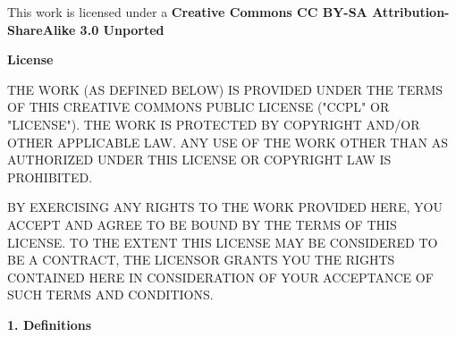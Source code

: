 
  \noindent This work is licensed under a \newline
  \textbf{Creative Commons CC BY-SA Attribution-ShareAlike 3.0 Unported}

  \begingroup
    \small

    \noindent \textbf{License}

    \noindent THE WORK (AS DEFINED BELOW) IS PROVIDED UNDER THE TERMS OF THIS CREATIVE COMMONS PUBLIC LICENSE ("CCPL" OR "LICENSE"). THE WORK IS PROTECTED BY COPYRIGHT AND/OR OTHER APPLICABLE LAW. ANY USE OF THE WORK OTHER THAN AS AUTHORIZED UNDER THIS LICENSE OR COPYRIGHT LAW IS PROHIBITED.

    \noindent BY EXERCISING ANY RIGHTS TO THE WORK PROVIDED HERE, YOU ACCEPT AND AGREE TO BE BOUND BY THE TERMS OF THIS LICENSE. TO THE EXTENT THIS LICENSE MAY BE CONSIDERED TO BE A CONTRACT, THE LICENSOR GRANTS YOU THE RIGHTS CONTAINED HERE IN CONSIDERATION OF YOUR ACCEPTANCE OF SUCH TERMS AND CONDITIONS.
    
    \noindent \textbf{1. Definitions}
    
